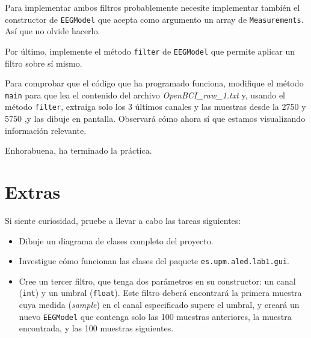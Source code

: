 \documentclass[10pt,a4paper,spanish]{article}
\newcommand{\code}[1]{\texttt{#1}}
\begin{document}
Para implementar ambos filtros probablemente necesite implementar también el constructor de \code{EEGModel} que acepta como argumento un array de \code{Measurements}. Así que no olvide hacerlo.

Por último, implemente el método \code{filter} de \code{EEGModel} que permite aplicar un filtro sobre sí mismo.

Para comprobar que el código que ha programado funciona, modifique el método \code{main} para que lea el contenido del archivo \textit{OpenBCI\_raw\_1.txt} y, usando el método \code{filter}, extraiga solo los 3 últimos canales y las muestras desde la 2750 y 5750 ,y las dibuje en pantalla. Observará cómo ahora sí que estamos visualizando información relevante.

Enhorabuena, ha terminado la práctica.

\section{Extras}

Si siente curiosidad, pruebe a llevar a cabo las tareas siguientes:

\begin{itemize}
\item Dibuje un diagrama de clases completo del proyecto.
\item Investigue cómo funcionan las clases del paquete \code{es.upm.aled.lab1.gui}.
\item Cree un tercer filtro, que tenga dos parámetros en su constructor: un canal (\code{int}) y un umbral (\code{float}). Este filtro deberá encontrará la primera muestra cuya medida (\textit{sample}) en el canal especificado supere el umbral, y creará un nuevo \code{EEGModel} que contenga solo las 100 muestras anteriores, la muestra encontrada, y las 100 muestras siguientes.
\end{itemize}
\end{document}
